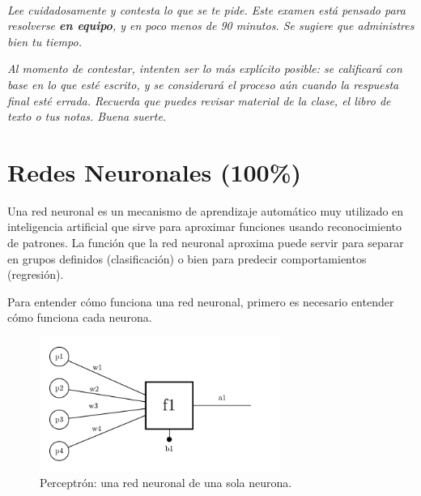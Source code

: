 \documentclass{article}
\title{
    \myclass \\
    \textbf{\mytitle} \\
    \myheader
    \date{}
}
\begin{document}
\maketitle

\vspace{-1.5cm}

{%
\footnotesize
\textit{Lee cuidadosamente y contesta lo que se te pide.
Este examen está pensado para resolverse \textbf{en equipo}, y en poco menos de 90 minutos.
Se sugiere que administres bien tu tiempo.}

\textit{Al momento de contestar, intenten ser lo más explícito posible: se calificará con base en lo que esté escrito, y se considerará el proceso aún cuando la respuesta final esté errada.
Recuerda que puedes revisar material de la clase, el libro de texto o tus notas.
Buena suerte.}
}

\section{Redes Neuronales (100\%)}

Una red neuronal es un mecanismo de aprendizaje automático muy utilizado en inteligencia artificial que sirve para aproximar funciones usando reconocimiento de patrones.
La función que la red neuronal aproxima puede servir para separar en grupos definidos (clasificación) o bien para predecir comportamientos (regresión).

Para entender cómo funciona una red neuronal, primero es necesario entender cómo funciona cada neurona.

\begin{figure}[htbp]
    \centering
    \includegraphics[width=0.7\textwidth]{perceptron.pdf}
    \caption{Perceptrón: una red neuronal de una sola neurona.}
    \label{fig:perceptron}
\end{figure}
\end{document}

